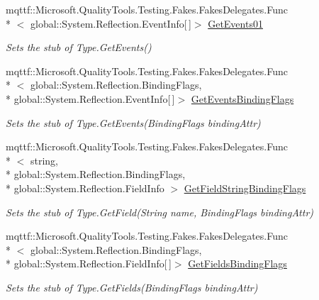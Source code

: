 \begin{DoxyCompactItemize}
mqttf\-::\-Microsoft.\-Quality\-Tools.\-Testing.\-Fakes.\-Fakes\-Delegates.\-Func\\*
$<$ global\-::\-System.\-Reflection.\-Event\-Info\mbox{[}$\,$\mbox{]}$>$ \hyperlink{class_system_1_1_fakes_1_1_stub_type_a8365351e25d02c41965b5b74b3379337}{Get\-Events01}
\begin{DoxyCompactList}\small\item\em Sets the stub of Type.\-Get\-Events()\end{DoxyCompactList}\item 
mqttf\-::\-Microsoft.\-Quality\-Tools.\-Testing.\-Fakes.\-Fakes\-Delegates.\-Func\\*
$<$ global\-::\-System.\-Reflection.\-Binding\-Flags, \\*
global\-::\-System.\-Reflection.\-Event\-Info\mbox{[}$\,$\mbox{]}$>$ \hyperlink{class_system_1_1_fakes_1_1_stub_type_a954cca36adf0051e5c6c6778aef93cd3}{Get\-Events\-Binding\-Flags}
\begin{DoxyCompactList}\small\item\em Sets the stub of Type.\-Get\-Events(\-Binding\-Flags binding\-Attr)\end{DoxyCompactList}\item 
mqttf\-::\-Microsoft.\-Quality\-Tools.\-Testing.\-Fakes.\-Fakes\-Delegates.\-Func\\*
$<$ string, \\*
global\-::\-System.\-Reflection.\-Binding\-Flags, \\*
global\-::\-System.\-Reflection.\-Field\-Info $>$ \hyperlink{class_system_1_1_fakes_1_1_stub_type_ad343ddd42f49f5d8258372720529cfce}{Get\-Field\-String\-Binding\-Flags}
\begin{DoxyCompactList}\small\item\em Sets the stub of Type.\-Get\-Field(\-String name, Binding\-Flags binding\-Attr)\end{DoxyCompactList}\item 
mqttf\-::\-Microsoft.\-Quality\-Tools.\-Testing.\-Fakes.\-Fakes\-Delegates.\-Func\\*
$<$ global\-::\-System.\-Reflection.\-Binding\-Flags, \\*
global\-::\-System.\-Reflection.\-Field\-Info\mbox{[}$\,$\mbox{]}$>$ \hyperlink{class_system_1_1_fakes_1_1_stub_type_a1f91fb7d9ff429abb8b090470cd75a81}{Get\-Fields\-Binding\-Flags}
\begin{DoxyCompactList}\small\item\em Sets the stub of Type.\-Get\-Fields(\-Binding\-Flags binding\-Attr)\end{DoxyCompactList}\item 

\end{DoxyCompactItemize}
